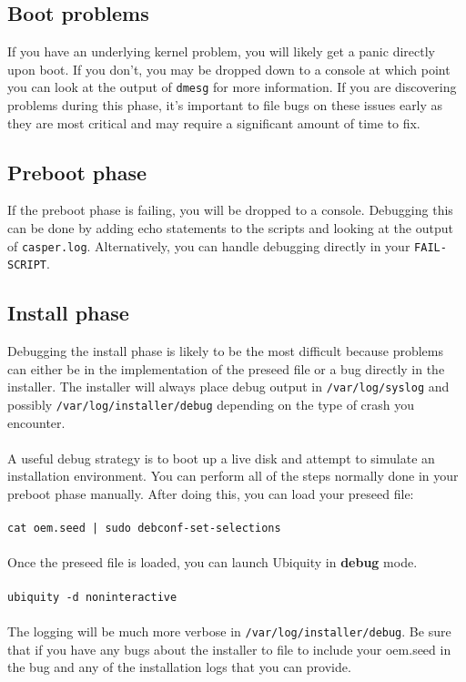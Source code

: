 \documentclass[letterpaper,10pt,titlepage]{article}
\begin{document}
\subsection{Boot problems}
If you have an underlying kernel problem, you will likely get a panic directly upon boot.  If you don't, you may be dropped down to a console at which point you can look at the output of \texttt{dmesg} for more information.  If you are discovering problems during this phase, it's important to file bugs on these issues early as they are most critical and may require a significant amount of time to fix.

\subsection{Preboot phase}
If the preboot phase is failing, you will be dropped to a console.  Debugging this can be done by adding echo statements to the scripts and looking at the output of \texttt{casper.log}.  Alternatively, you can handle debugging directly in your \texttt{FAIL-SCRIPT}.

\subsection{Install phase}
Debugging the install phase is likely to be the most difficult because problems can either be in the implementation of the preseed file or a bug directly in the installer.  The installer will always place debug output in \texttt{/var/log/syslog} and possibly \texttt{/var/log/installer/debug} depending on the type of crash you encounter.
\\
\\
A useful debug strategy is to boot up a live disk and attempt to simulate an installation environment.  You can perform all of the steps normally done in your preboot phase manually.  After doing this, you can load your preseed file:
\\
\\
\texttt{cat oem.seed | sudo debconf-set-selections}
\\
\\
Once the preseed file is loaded, you can launch Ubiquity in \textbf{debug} mode.
\\
\\
\texttt{ubiquity -d noninteractive}
\\
\\
The logging will be much more verbose in \texttt{/var/log/installer/debug}.  Be sure that if you have any bugs about the installer to file to include your oem.seed in the bug and any of the installation logs that you can provide.
\end{document}
